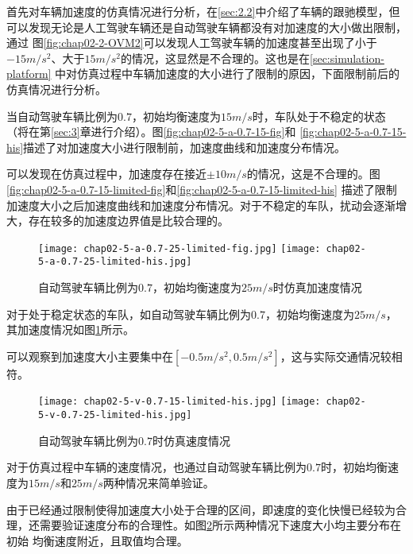 首先对车辆加速度的仿真情况进行分析，在\ref{sec:2.2}中介绍了车辆的跟驰模型，但可以发现无论是人工驾驶车辆还是自动驾驶车辆都没有对加速度的大小做出限制，通过
图\ref{fig:chap02-2-OVM2}可以发现人工驾驶车辆的加速度甚至出现了小于$-15m/s^2$、大于$15m/s^2$的情况，这显然是不合理的。这也是在\ref{sec:simulation-platform}
中对仿真过程中车辆加速度的大小进行了限制的原因，下面限制前后的仿真情况进行分析。

当自动驾驶车辆比例为$0.7$，初始均衡速度为$15m/s$时，车队处于不稳定的状态（将在第\ref{sec:3}章进行介绍）。图\ref{fig:chap02-5-a-0.7-15-fig}和
\ref{fig:chap02-5-a-0.7-15-his}描述了对加速度大小进行限制前，加速度曲线和加速度分布情况。

可以发现在仿真过程中，加速度存在接近$\pm 10m/s$的情况，这是不合理的。图\ref{fig:chap02-5-a-0.7-15-limited-fig}和\ref{fig:chap02-5-a-0.7-15-limited-his}
描述了限制加速度大小之后加速度曲线和加速度分布情况。对于不稳定的车队，扰动会逐渐增大，存在较多的加速度边界值是比较合理的。

\begin{figure}
  \centering
    {\texttt{[image: chap02-5-a-0.7-25-limited-fig.jpg]}}
    {\texttt{[image: chap02-5-a-0.7-25-limited-his.jpg]}}
  \caption{自动驾驶车辆比例为$0.7$，初始均衡速度为$25m/s$时仿真加速度情况}
  \label{fig:chap02-6}
\end{figure}

对于处于稳定状态的车队，如自动驾驶车辆比例为$0.7$，初始均衡速度为$25m/s$，其加速度情况如图\ref{fig:chap02-6}所示。

可以观察到加速度大小主要集中在$[-0.5m/s^2, 0.5m/s^2]$，这与实际交通情况较相符。

\begin{figure}
  \centering
    {\texttt{[image: chap02-5-v-0.7-15-limited-his.jpg]}}
    {\texttt{[image: chap02-5-v-0.7-25-limited-his.jpg]}}
  \caption{自动驾驶车辆比例为$0.7$时仿真速度情况}
  \label{fig:chap02-7}
\end{figure}

对于仿真过程中车辆的速度情况，也通过自动驾驶车辆比例为$0.7$时，初始均衡速度为$15m/s$和$25m/s$两种情况来简单验证。

由于已经通过限制使得加速度大小处于合理的区间，即速度的变化快慢已经较为合理，还需要验证速度分布的合理性。如图\ref{fig:chap02-7}所示两种情况下速度大小均主要分布在初始
均衡速度附近，且取值均合理。

